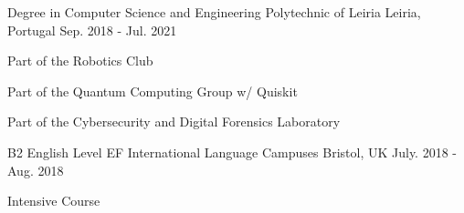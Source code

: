 

\begin{cventries}

\cventry
    {Degree in Computer Science and Engineering} %
    {Polytechnic of Leiria} %
    {Leiria, Portugal} %
    {Sep. 2018 - Jul. 2021} %
    {
      \begin{cvitems} %
        \item {Part of the Robotics Club}
        \item {Part of the Quantum Computing Group w/ Quiskit}
        \item {Part of the Cybersecurity and Digital Forensics Laboratory}
      \end{cvitems}
    }

\cventry
    {B2 English Level} %
    {EF International Language Campuses} %
    {Bristol, UK} %
    {July. 2018 - Aug. 2018} %
    {
        \begin{cvitems} %
        \item {Intensive Course}
      \end{cvitems}
    }

\end{cventries}

